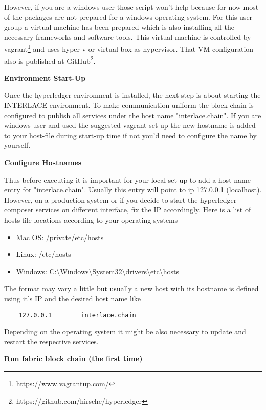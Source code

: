 However, if you are a windows user those script won't help because for now most of the packages are not prepared for a windows operating system. For this user group a virtual machine has been prepared which is also installing all the necessary frameworks and software tools. This virtual machine is controlled by vagrant\footnote{https://www.vagrantup.com/} and uses hyper-v or virtual box as hypervisor. That VM configuration also is published at GitHub\footnote{https://github.com/hirsche/hyperledger}.

\textbf{Environment Start-Up}

Once the hyperledger environment is installed, the next step is about starting the INTERLACE environment. To make communication uniform the block-chain is configured to publish all services under the host name "interlace.chain". If you are windows user and used the suggested vagrant set-up the new hostname is added to your host-file during start-up time if not you'd need to configure the name by yourself.

\textbf{Configure Hostnames}

Thus before executing it is important for your local set-up to add a host name entry for "interlace.chain". Usually this entry will point to ip 127.0.0.1 (localhost). However, on a production system or if you decide to start the hyperledger composer services on different interface, fix the IP accordingly. Here is a list of hosts-file locations according to your operating systems

\begin{itemize}
	\item Mac OS: /private/etc/hosts
    \item Linux: /etc/hosts
    \item Windows: C:\textbackslash Windows\textbackslash System32\textbackslash drivers\textbackslash etc\textbackslash hosts
\end{itemize}

The format may vary a little but usually a new host with its hostname is defined using it's IP and the desired host name like

\begin{lstlisting}
	127.0.0.1        interlace.chain
\end{lstlisting}

Depending on the operating system it might be also necessary to update and restart the respective services.

\textbf{Run fabric block chain (the first time)}

